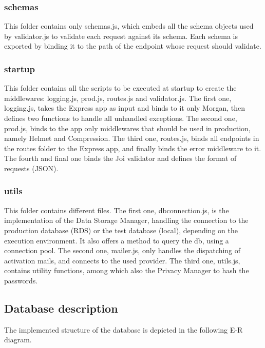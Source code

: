 \documentclass[titlepage]{article}
\begin{document}
	\subsubsection{schemas}
	This folder contains only schemas.js, which embeds all the schema objects used by validator.js to validate each request against its schema. Each schema is exported by binding it to the path of the endpoint whose request should validate.
	
	\subsubsection{startup}
	This folder contains all the scripts to be executed at startup to create the middlewares: logging.js, prod.js, routes.js and validator.js.
	The first one, logging.js, takes the Express app as input and binds to it only Morgan, then defines two functions to handle all unhandled exceptions.
	The second one, prod.js, binds to the app only middlewares that should be used in production, namely Helmet and Compression.
	The third one, routes.js, binds all endpoints in the routes folder to the Express app, and finally binds the error middleware to it.
	The fourth and final one binds the Joi validator and defines the format of requests (JSON).
	
	\subsubsection{utils}
	This folder contains different files.
	The first one, dbconnection.js, is the implementation of the Data Storage Manager, handling the connection to the production database (RDS) or the test database (local), depending on the execution environment. It also offers a method to query the db, using a connection pool.
	The second one, mailer.js, only handles the dispatching of activation mails, and connects to the used provider.
	The third one, utils.js, contains utility functions, among which also the Privacy Manager to hash the passwords.
	
	
	\subsection{Database description}
	The implemented structure of the database is depicted in the following E-R diagram.
	
\end{document}
